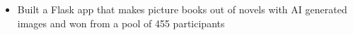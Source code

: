 \begin{itemize}
    \item  Built a Flask app that makes picture books out of novels with AI generated images and won from a pool of 455 participants
\end{itemize}